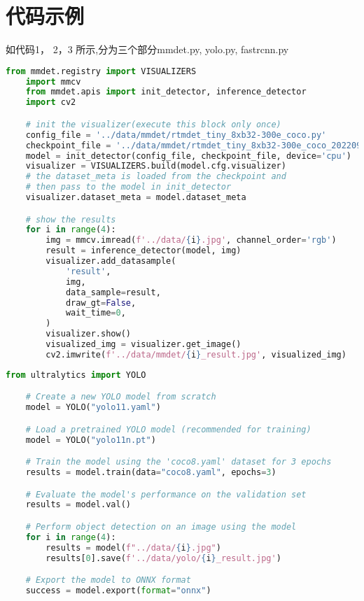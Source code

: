 \section{代码示例}

如代码1， 2，3 所示,分为三个部分mmdet.py, yolo.py, fastrcnn.py

\begin{lstlisting}[caption={mmdet.py}, label={lst:code-example}, captionpos=t, language=python]
    from mmdet.registry import VISUALIZERS
    import mmcv
    from mmdet.apis import init_detector, inference_detector
    import cv2

    # init the visualizer(execute this block only once)
    config_file = '../data/mmdet/rtmdet_tiny_8xb32-300e_coco.py'
    checkpoint_file = '../data/mmdet/rtmdet_tiny_8xb32-300e_coco_20220902_112414-78e30dcc.pth'
    model = init_detector(config_file, checkpoint_file, device='cpu')  # or device='cuda:0'
    visualizer = VISUALIZERS.build(model.cfg.visualizer)
    # the dataset_meta is loaded from the checkpoint and
    # then pass to the model in init_detector
    visualizer.dataset_meta = model.dataset_meta

    # show the results
    for i in range(4):
        img = mmcv.imread(f'../data/{i}.jpg', channel_order='rgb')
        result = inference_detector(model, img)
        visualizer.add_datasample(
            'result',
            img,
            data_sample=result,
            draw_gt=False,
            wait_time=0,
        )
        visualizer.show()
        visualized_img = visualizer.get_image()
        cv2.imwrite(f'../data/mmdet/{i}_result.jpg', visualized_img)
\end{lstlisting}

\begin{lstlisting}[caption={yolo.py}, label={lst:code-example}, captionpos=t, language=python]
    from ultralytics import YOLO

    # Create a new YOLO model from scratch
    model = YOLO("yolo11.yaml")

    # Load a pretrained YOLO model (recommended for training)
    model = YOLO("yolo11n.pt")

    # Train the model using the 'coco8.yaml' dataset for 3 epochs
    results = model.train(data="coco8.yaml", epochs=3)

    # Evaluate the model's performance on the validation set
    results = model.val()

    # Perform object detection on an image using the model
    for i in range(4):
        results = model(f"../data/{i}.jpg")
        results[0].save(f'../data/yolo/{i}_result.jpg')

    # Export the model to ONNX format
    success = model.export(format="onnx")
\end{lstlisting}

